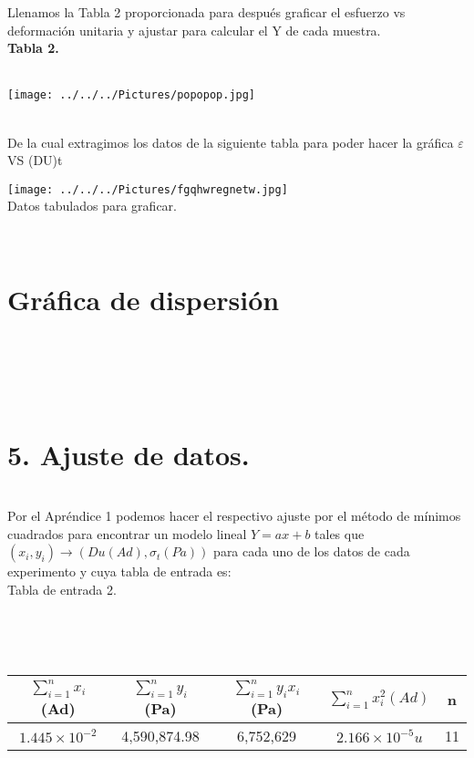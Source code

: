 \documentclass[10pt,a4paper]{article}
\begin{document}
\medskip

Llenamos la Tabla 2 proporcionada para despu\'{e}s graficar el esfuerzo vs deformaci\'{o}n unitaria y ajustar para calcular el Y de cada muestra.\\
\textbf{Tabla 2.}\\
\\
\begin{figure 2}
\centering
\texttt{[image: ../../../Pictures/popopop.jpg]}   
\end{figure 2}
\\
De la cual extragimos los datos de la siguiente tabla para poder hacer la gr\'{a}fica $\varepsilon$ VS (DU)t
 
\begin{figure 3}
\centering
\texttt{[image: ../../../Pictures/fgqhwregnetw.jpg]} 
\\
\caption{Datos tabulados para graficar.}
\end{figure 3}
\\
\section*{Gr\'{a}fica de dispersi\'{o}n}
\\
\\
\begin{figure 5}
\centering
\texttt{[image: ../../../Pictures/rrrrrrrrrrrrr.jpg]} 
\\ 
\caption{Gr\'{a}fico de dispersi\'o}n para el m\'{e}todo de nivel.}
\end{figure 5}
\\
\section*{5. Ajuste de datos.}\\
Por el Apr\'{e}ndice 1 podemos hacer el respectivo ajuste por el m\'{e}todo de m\'{i}nimos cuadrados para encontrar un modelo lineal $Y=ax +b$ tales que $\left( { x }_{ i },{ y }_{ i } \right) \rightarrow \left( Du(Ad),{ \sigma  }_{ t }(Pa) \right) $ para cada uno de los datos de cada experimento y cuya tabla de entrada es:
\medskip
\\
\caption{Tabla de entrada 2.}
\\
\begin{figure 6}
\\
\medskip  
\medskip 
\centering
\begin{tabular}{|c|c|c|c|c|}
\hline 
$\sum _{ i=1 }^{ n }{ { x }_{ i } } $(Ad) & $\sum _{ i=1 }^{ n }{ { y }_{ i } } $ (Pa) & $ \sum _{ i=1 }^{ n }{ { y }_{ i } } { x }_{ i }$ (Pa) & $\sum _{ i=1 }^{ n }{ { x }_{ i }^{ 2 } }(Ad)$ & n \\ 
\hline 
$1.445\times { 10 }^{ -2 }$& 4,590,874.98 & 6,752,629 & $2.166\times { 10 }^{ -5 }u$& 11 \\ 
\hline 
\end{tabular} 
\end{figure 6}
\\
\end{document}
